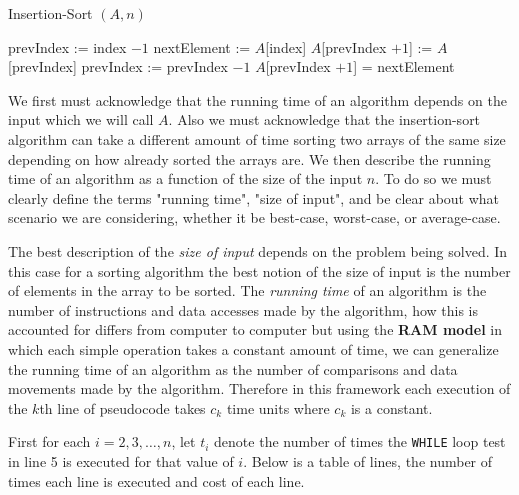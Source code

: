 \documentclass[12pt letter]{report}
\begin{document}
\begin{algorithm}[H]
  \caption{Insertion-Sort $\left( A,n \right) $}
  \begin{algorithmic}[1]
    \State prevIndex := index $- 1$
    \State nextElement := $A$[index]
    \State $A$[prevIndex $+ 1$] := $A$[prevIndex]
    \State prevIndex := prevIndex $- 1$
    \EndWhile
    \State     $A$[prevIndex $ + 1$] = nextElement
    \EndFor
  \end{algorithmic}
\end{algorithm}


We first must acknowledge that the running time of an algorithm depends on the input which we will call $A$. Also we
must acknowledge that the insertion-sort algorithm can take a different amount of time sorting two arrays of the same
size depending on how already sorted the arrays are. We then describe the running time of an algorithm as a function of
the size of the input $n$. To do so we must clearly define the terms "running time", "size of input", and be clear about
what scenario we are considering, whether it be best-case, worst-case, or average-case.

The best description of the \textit{size of input} depends on the problem being solved. In this case for a sorting algorithm the
best notion of the size of input is the number of elements in the array to be sorted. The \textit{running time} of an
algorithm is the number of instructions and data accesses made by the algorithm, how this is accounted for differs from
computer to computer but using the \textbf{RAM model} in which each simple operation takes a constant amount of time, we
can generalize the running time of an algorithm as the number of comparisons and data movements made by the algorithm.
Therefore in this framework each execution of the $k$th line of pseudocode takes $c_k$ time units where $c_k$ is a
constant.

First for each $i = 2,3,\ldots,n$, let $t_i$ denote the number of times the \lstinline{WHILE} loop test in line 5 is executed for
that value of $i$. Below is a table of lines, the number of times each line is executed and cost of each line.
\end{document}
